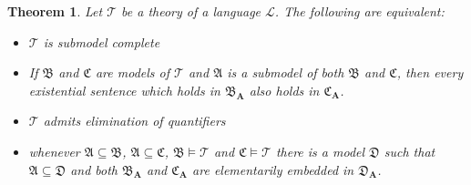 \documentclass[titlepage, oneside]{amsbook}
\theoremstyle{plain}
\newtheorem{theorem}{Theorem}
\theoremstyle{definition}
\theoremstyle{remark}
\newcommand{\theory}{\ensuremath{\mathcal{T}}}
\newcommand{\seq}{\ensuremath{\subseteq}}
\newcommand{\ma}{\ensuremath{\mathfrak{A}}}
\newcommand{\mb}{\ensuremath{\mathfrak{B}}}
\newcommand{\mc}{\ensuremath{\mathfrak{C}}}
\newcommand{\md}{\ensuremath{\mathfrak{D}}}
\newcommand{\ba}{\ensuremath{\mathbf{A}}}
\begin{document}
\begin{theorem}\label{T:subcom}
%
 Let $\mathcal T$ be a theory of a language 
$\mathcal L$. The following are equivalent:

\begin{itemize}
\item[(1)] $\mathcal T$ is submodel complete
\item[(2)] If $\mb$ and $\mc$ are models of $\theory$ and $\ma$ is a
submodel of both $\mb$ and $\mc$, then every existential sentence which
holds in $\mb_\ba$ also holds in $\mc_\ba$.
\item[(3)] $\mathcal T$ admits elimination of quantifiers
\item[(4)] whenever $\mathfrak{A} \subseteq \mathfrak{B}$, 
$\mathfrak{A}
\seq \mathfrak{C}$, $\mathfrak{B} \models \mathcal T$ and $\mathfrak
C \models \mathcal T$ there is a model $\mathfrak D$ such that 
$\mathfrak A \subseteq \mathfrak D$ and both
$\mb_\ba$ and $\mc_\ba$ are elementarily embedded in $\md_\ba$.

\end{itemize}
\end{theorem}
\end{document}
